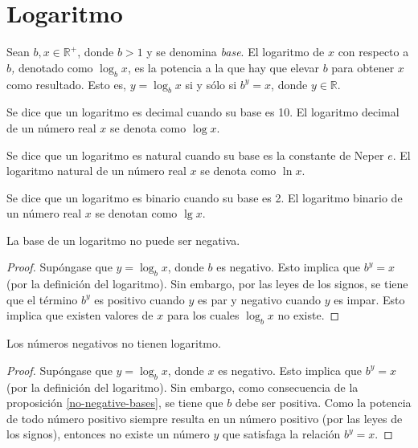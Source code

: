\section{Logaritmo}
\begin{defn}[Logaritmo]
Sean $b,x\in\mathbb{R}^{+}$, donde $b>1$ y se denomina \emph{base}.
El logaritmo de \emph{$x$} con respecto a \emph{$b$, }denotado como
$\log_{b}x$, es la potencia a la que hay que elevar $b$ para obtener
$x$ como resultado. Esto es, $y=\log_{b}x$ si y sólo si $b^{y}=x$,
donde $y\in\mathbb{R}$.
\end{defn}
%
\begin{defn}
Se dice que un logaritmo es decimal cuando su base es 10. El logaritmo
decimal de un número real $x$ se denota como $\log x$. 
\end{defn}
%
\begin{defn}
Se dice que un logaritmo es natural cuando su base es la constante
de Neper $e$. El logaritmo natural de un número real $x$ se denota
como $\ln x$.
\end{defn}
%
\begin{defn}
Se dice que un logaritmo es binario cuando su base es 2. El logaritmo
binario de un número real $x$ se denotan como $\lg x$.
\end{defn}
\begin{prop}
\label{no-negative-bases}La base de un logaritmo no puede ser negativa.
\end{prop}
\begin{proof}
Supóngase que $y=\log_{b}x$, donde $b$ es negativo. Esto implica
que $b^{y}=x$ (por la definición del logaritmo). Sin embargo, por
las leyes de los signos, se tiene que el término $b^{y}$ es positivo
cuando $y$ es par y negativo cuando $y$ es impar. Esto implica que
existen valores de $x$ para los cuales $\log_{b}x$ no existe.
\end{proof}
\begin{prop}
\label{no-negative-logarithm}Los números negativos no tienen logaritmo.
\end{prop}
\begin{proof}
Supóngase que $y=\log_{b}x$, donde $x$ es negativo. Esto implica
que $b^{y}=x$ (por la definición del logaritmo). Sin embargo, como
consecuencia de la proposición \ref{no-negative-bases}, se tiene
que $b$ debe ser positiva. Como la potencia de todo número positivo
siempre resulta en un número positivo (por las leyes de los signos),
entonces no existe un número $y$ que satisfaga la relación $b^{y}=x$.
\end{proof}
